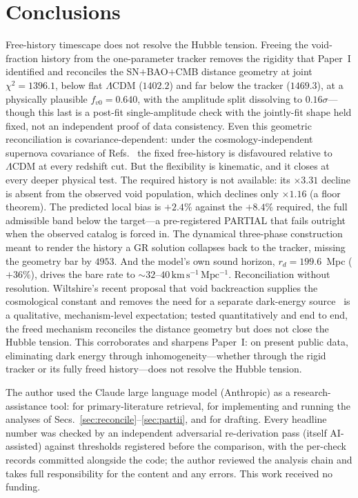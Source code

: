 \documentclass[aps,prd,twocolumn,nofootinbib,superscriptaddress,floatfix]{revtex4-2}
\newcommand{\fvo}{f_{v0}}
\newcommand{\kmsmpc}{\,\mathrm{km\,s^{-1}\,Mpc^{-1}}}
\newcommand{\Lcdm}{\Lambda\mathrm{CDM}}
\newcommand{\rd}{r_{d}}
\begin{document}
\section{Conclusions}
\label{sec:concl}

Free-history timescape does not resolve the Hubble tension. Freeing the
void-fraction history from the one-parameter tracker removes the rigidity that
Paper~I identified and reconciles the SN$+$BAO$+$CMB distance geometry at joint
$\chi^2=1396.1$, below flat $\Lcdm$ ($1402.2$) and far below the tracker
($1469.3$), at a physically plausible $\fvo=0.640$, with the amplitude split
dissolving to $0.16\sigma$---though this last is a post-fit single-amplitude check
with the jointly-fit shape held fixed, not an independent proof of data
consistency. Even this geometric reconciliation is covariance-dependent: under the
cosmology-independent supernova covariance of Refs.~\cite{Lane2025,Seifert2024} the
fixed free-history is disfavoured relative to $\Lcdm$ at every redshift cut. But the
flexibility is kinematic, and it closes at every deeper physical test. The required
history is not available: its $\times3.31$ decline is absent from the observed void
population, which declines only $\times1.16$ (a floor theorem). The predicted local
bias is $+2.4\%$ against the $+8.4\%$ required, the full admissible band below the
target---a pre-registered PARTIAL that fails outright when the observed catalog is
forced in. The dynamical three-phase construction meant to render the history a GR
solution collapses back to the tracker, missing the geometry bar by $4953$. And the
model's own sound horizon, $\rd=199.6$~Mpc ($+36\%$), drives the bare rate to
$\sim\!32$--$40\kmsmpc$. Reconciliation without resolution. Wiltshire's recent
proposal that void backreaction supplies the cosmological constant and removes the
need for a separate dark-energy source~\cite{Wiltshire2024} is a qualitative,
mechanism-level expectation; tested quantitatively and end to end, the freed
mechanism reconciles the distance geometry but does not close the Hubble tension.
This corroborates and sharpens Paper~I: on present public data, eliminating dark
energy through inhomogeneity---whether through the rigid tracker or its fully freed
history---does not resolve the Hubble tension.

\begin{acknowledgments}
The author used the Claude large language model (Anthropic) as a
research-assistance tool: for primary-literature retrieval, for implementing and
running the analyses of Secs.~\ref{sec:reconcile}--\ref{sec:partii}, and for
drafting. Every headline number was checked by an independent adversarial
re-derivation pass (itself AI-assisted) against thresholds registered before the
comparison, with the per-check records committed alongside the code; the author
reviewed the analysis chain and takes full responsibility for the content and
any errors. This work received no funding.
\end{acknowledgments}
\end{document}
